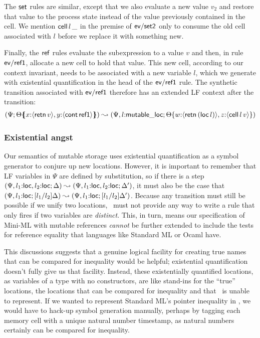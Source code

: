 The ${\sf set}$ rules are similar, except that we also evaluate a new value
$v_2$ and restore that 
value to the process state instead of the value previously
contained in the cell. We mention ${\sf cell}\,l\,\_$ in the
premise of ${\sf ev/set2}$ only to consume the old cell associated with $l$
before we replace it with something new.

Finally, the ${\sf ref}$ rules evaluate the subexpression to a value
$v$ and then, in rule ${\sf ev/ref1}$, allocate a new cell to hold
that value. This new cell, according to our context invariant, needs
to be associated with a new variable $l$, which we generate with
existential quantification in the head of the ${\sf ev/ref1}$ rule.
The synthetic transition associated with ${\sf ev/ref1}$ therefore has
an extended LF context after the transition:
\begin{align*}
(\Psi;  {\Theta}\mbox{$\{\hspace{-4pt}\{$}{x{:}\langle {{\sf retn}\,v} \rangle, y{:}\langle {{\sf cont}\,{\sf ref1}} \rangle}\mbox{$\}\hspace{-4pt}\}$})
\leadsto 
(\Psi, l{:}{\sf mutable\_loc}; {\Theta}\{{w{:}\langle {{\sf retn}\,({\sf loc}\,l)} \rangle,
z{:}\langle {{\sf cell}\,l\,v} \rangle}\})
\end{align*}

\subsubsection{Existential angst} 

Our semantics of mutable storage uses existential quantification 
as a symbol generator to conjure up new locations. However, it is important
to remember that LF variables in $\Psi$ are defined by substitution,
so if there is a step 
$(\Psi, l_1{:}{\sf loc}, l_2{:}{\sf loc}; \Delta)
  \leadsto 
 (\Psi, l_1{:}{\sf loc}, l_2{:}{\sf loc}; \Delta')$,
it must also be the case that 
$(\Psi, l_1{:}{\sf loc}; [l_1/l_2]\Delta)
  \leadsto 
 (\Psi, l_1{:}{\sf loc}; [l_1/l_2]\Delta')$. 
%
 Because any transition must still be possible if we unify two
 locations, \sls~must not provide any way to write a rule that only
 fires if two variables are {\it distinct}. This, in turn, means our
 specification of Mini-ML with mutable references {\it cannot} be
 further extended to include the tests for reference equality that
 languages like Standard ML or Ocaml have.

This discussions suggests that a 
genuine logical facility for creating true names that can be compared
for inequality would be helpful; 
existential quantification doesn't fully give us
that facility. Instead, these existentially quantified locations, as
variables of a type with no constructors, are 
like stand-ins 
for the ``true'' locations, the locations that can be compared for
inequality and that \sls~is unable to represent.  If we wanted to
represent Standard ML's pointer inequality in \sls, we would have
to hack-up symbol generation manually, perhaps by tagging each memory cell
with a unique natural number timestamp, as natural numbers certainly can be
compared for inequality.

